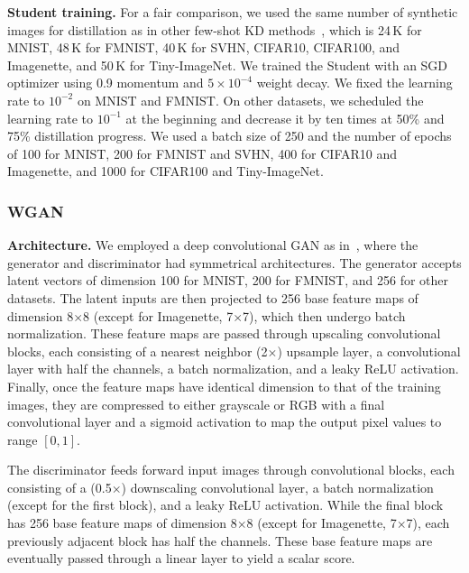 \documentclass[12pt, a4paper, twoside]{book}
\numberwithin{equation}{chapter}
\theoremstyle{plain}
\theoremstyle{definition}
\theoremstyle{remark}
\newenvironment{foldable}{}{}
\begin{document}
\begin{foldable}
  \textbf{Student training.} For a fair comparison, we used the same number of synthetic images for distillation as in other few-shot \ac{KD} methods~\cite{kimura2018few,wang2020neural,nguyen2022black}, which is 24\,K for MNIST, 48\,K for FMNIST, 40\,K for SVHN, CIFAR10, CIFAR100, and Imagenette, and 50\,K for Tiny-ImageNet.
  We trained the Student with an SGD optimizer using 0.9 momentum and $5 \times 10^{-4}$ weight decay.
  We fixed the learning rate to $10^{-2}$ on MNIST and FMNIST.
  On other datasets, we scheduled the learning rate to $10^{-1}$ at the beginning and decrease it by ten times at 50\% and 75\% distillation progress.
  We used a batch size of 250 and the number of epochs of 100 for MNIST, 200 for FMNIST and SVHN, 400 for CIFAR10 and Imagenette, and 1000 for CIFAR100 and Tiny-ImageNet.
\end{foldable}

\subsubsection{WGAN}
\begin{foldable}
  \textbf{Architecture.} We employed a deep convolutional GAN as in~\cite{radford2015unsupervised}, where the generator and discriminator had symmetrical architectures.
  The generator accepts latent vectors of dimension 100 for MNIST, 200 for FMNIST, and 256 for other datasets.
  The latent inputs are then projected to 256 base feature maps of dimension 8$\times$8 (except for Imagenette, 7$\times$7), which then undergo batch normalization.
  These feature maps are passed through upscaling convolutional blocks, each consisting of a nearest neighbor (2$\times$) upsample layer, a convolutional layer with half the channels, a batch normalization, and a leaky ReLU activation.
  Finally, once the feature maps have identical dimension to that of the training images, they are compressed to either grayscale or RGB with a final convolutional layer and a sigmoid activation to map the output pixel values to range $[0, 1]$.

  The discriminator feeds forward input images through convolutional blocks, each consisting of a (0.5$\times$) downscaling convolutional layer, a batch normalization (except for the first block), and a leaky ReLU activation.
  While the final block has 256 base feature maps of dimension 8$\times$8 (except for Imagenette, 7$\times$7), each previously adjacent block has half the channels.
  These base feature maps are eventually passed through a linear layer to yield a scalar score.
\end{foldable}
\end{document}

